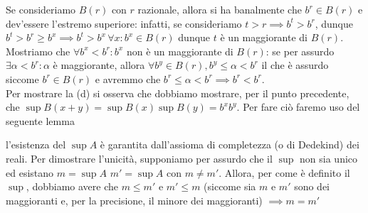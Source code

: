 \documentclass{report}
\begin{document}
\begin{mysolution}
\noindent Se consideriamo $B(r)$ con $r$ razionale, allora si ha banalmente che $b^r \in B(r)$ e dev'essere l'estremo superiore: infatti, se consideriamo $t > r \implies b^t > b^r$, dunque $b^t > b^r \geq b^x \implies b^t > b^x \, \forall x: b^x \in B(r)$ dunque $t$ è un maggiorante di $B(r)$. Mostriamo che $\forall b^x < b^r: b^x$ non è un maggiorante di $B(r)$: se per assurdo $\exists \alpha < b^r: \alpha$ è maggiorante, allora $\forall b^y \in B(r), b^y \leq \alpha < b^r$ il che è assurdo siccome $b^r \in B(r)$ e avremmo che $b^r \leq \alpha < b^r \implies b^r < b^r$. \\
	Per mostrare la (d) si osserva che dobbiamo mostrare, per il punto precedente, che $\sup{B(x+y)} = \sup{B(x)}\sup{B(y)} = b^x b^y$. Per fare ciò faremo uso del seguente lemma
	\begin{myproof}
	l'esistenza del $\sup{A}$ è garantita dall'assioma di completezza (o di Dedekind) dei reali. Per dimostrare l'unicità, supponiamo per assurdo che il $\sup$ non sia unico ed esistano $m=\sup{A}$ $m'=\sup{A}$ con $m \neq m'$. Allora, per come è definito il $\sup$, dobbiamo avere che $m \leq m'$ e $m' \leq m$ (siccome sia $m$ e $m'$ sono dei maggioranti e, per la precisione, il minore dei maggioranti) $\implies m = m'$
	\end{myproof}	
	

\end{mysolution}
\end{document}
